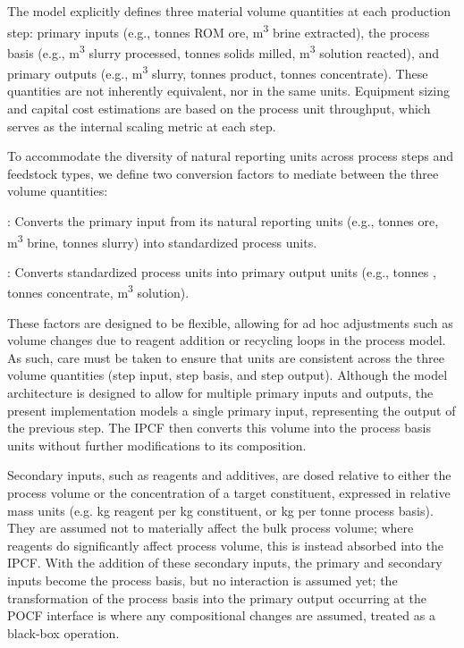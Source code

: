 The model explicitly defines three material volume quantities at each production step: primary inputs (e.g., tonnes ROM ore, m\textsuperscript{3} brine extracted), the process basis (e.g., m\textsuperscript{3} slurry processed, tonnes solids milled, m\textsuperscript{3} solution reacted), and primary outputs (e.g., m\textsuperscript{3} slurry, tonnes  product, tonnes concentrate). These quantities are not inherently equivalent, nor in the same units. Equipment sizing and capital cost estimations are based on the process unit throughput, which serves as the internal scaling metric at each step.

To accommodate the diversity of natural reporting units across process steps and feedstock types, we define two conversion factors to mediate between the three volume quantities: 

\begin{description}[noitemsep, topsep=0pt]
    \item[\textbullet\enskip Input-to-Process Conversion Factor (IPCF)]: Converts the primary input from its natural reporting units (e.g., tonnes ore, m\textsuperscript{3} brine, tonnes slurry) into standardized process units.
    
    \item[\textbullet\enskip Process-to-Output Conversion Factor (POCF)]: Converts standardized process units into primary output units (e.g., tonnes , tonnes concentrate, m\textsuperscript{3} solution).
\end{description}

These factors are designed to be flexible, allowing for ad hoc adjustments such as volume changes due to reagent addition or recycling loops in the process model. As such, care must be taken to ensure that units are consistent across the three volume quantities (step input, step basis, and step output). Although the model architecture is designed to allow for multiple primary inputs and outputs, the present implementation models a single primary input, representing the output of the previous step. The IPCF then converts this volume into the process basis units without further modifications to its composition. 

Secondary inputs, such as reagents and additives, are dosed relative to either the process volume or the concentration of a target constituent, expressed in relative mass units (e.g. kg reagent per kg constituent, or kg per tonne process basis). They are assumed not to materially affect the bulk process volume; where reagents do significantly affect process volume, this is instead absorbed into the IPCF. With the addition of these secondary inputs, the primary and secondary inputs become the process basis, but no interaction is assumed yet; the transformation of the process basis into the primary output occurring at the POCF interface is where any compositional changes are assumed, treated as a black-box operation. 

